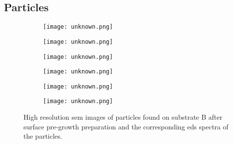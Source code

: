\subsection{Particles}
\begin{figure}
    \centering
    \begin{subfigure}[t]{\textwidth}
          \begin{minipage}[t]{0.49\linewidth}
            \centering
            \texttt{[image: unknown.png]}
          \end{minipage}
          \hfill
          \begin{minipage}[t]{0.49\linewidth}
            \centering
            \texttt{[image: unknown.png]}
          \end{minipage}
        \caption{}\label{fig:add_label}
    \end{subfigure}
    \par\bigskip
    \begin{subfigure}[t]{\textwidth}
          \begin{minipage}[t]{0.49\linewidth}
            \centering
            \texttt{[image: unknown.png]}
          \end{minipage}
          \hfill
          \begin{minipage}[t]{0.49\linewidth}
            \centering
            \texttt{[image: unknown.png]}
          \end{minipage}
        \caption{}\label{fig:add_label}
    \end{subfigure}
    \par\bigskip
    \begin{subfigure}[t]{\textwidth}
          \begin{minipage}[t]{0.49\linewidth}
            \centering
            \texttt{[image: unknown.png]}
          \end{minipage}
          \hfill
          \begin{minipage}[t]{0.49\linewidth}
            \centering
            \texttt{[image: unknown.png]}
          \end{minipage}
        \caption{}\label{fig:add_label}
    \end{subfigure}
    \caption[\Ac{sem} images and \ac{eds} spectra of particles found on substrate B after surface pre-growth preparation.]{High resolution \acf{sem} images of particles found on substrate B after surface pre-growth preparation and the corresponding \acf{eds} spectra of the particles.}\label{fig:subBb_sem_w_eds}
\end{figure}

